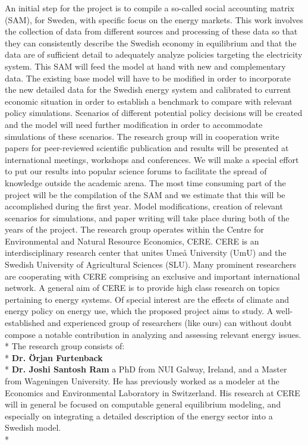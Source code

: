 \documentclass[10pt,a4paper]{article}
\begin{document}
An initial step for the project is to compile a so-called social accounting matrix (SAM), for Sweden, with specific focus on the energy markets. This work involves the collection of data from different sources and processing of these data so that they can consistently describe the Swedish economy in equilibrium and that the data are of sufficient detail to adequately analyze policies targeting the electricity system. This SAM will feed the model at hand with new and complementary data.
The existing base model will have to be modified in order to incorporate the new detailed data for the Swedish energy system and calibrated to current economic situation in order to establish a benchmark to compare with relevant policy simulations. Scenarios of different potential policy decisions will be created and the model will need further modification in order to accommodate simulations of these scenarios.
The research group will in cooperation write papers for peer-reviewed scientific publication and results will be presented at international meetings, workshops and conferences. We will make a special effort to put our results into popular science forums to facilitate the spread of knowledge outside the academic arena.
The most time consuming part of the project will be the compilation of the SAM and we estimate that this will be accomplished during the first year. Model modifications, creation of relevant scenarios for simulations, and paper writing will take place during both of the years of the project.
The research group operates within the Centre for Environmental and Natural Resource Economics, CERE. CERE is an interdisciplinary research center that unites Umeå University (UmU) and the Swedish University of Agricultural Sciences (SLU). Many prominent researchers are cooperating with CERE comprising an exclusive and important international network. A general aim of CERE is to provide high class research on topics pertaining to energy systems. Of special interest are the effects of climate and energy policy on energy use, which the proposed project aims to study. A well-established and experienced group of researchers (like ours) can without doubt compose a notable contribution in analyzing and assessing relevant energy issues.\\*
The research group consists of:\\*
\textbf{Dr. Örjan Furtenback}\\*
\textbf{Dr. Joshi Santosh Ram} a PhD from NUI Galway, Ireland, and a Master from Wageningen University. He has previously worked as a modeler at the Economics and Environmental Laboratory in Switzerland. His research at CERE will in general be focused on computable general equilibrium modeling, and especially on integrating a detailed description of the energy sector into a Swedish model.\\*
\end{document}
